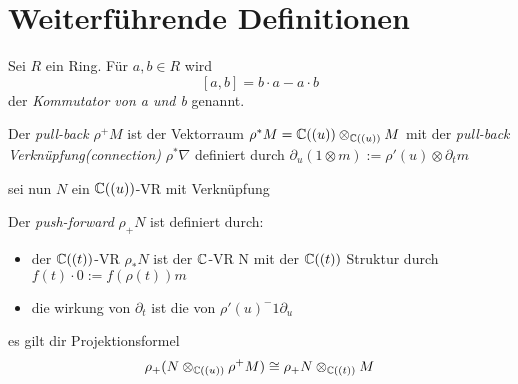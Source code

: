 \section{Weiterführende Definitionen}

\begin{defn}[Kommutator]%
  Sei $R$ ein Ring. Für $a,b\in R$ wird
  \[[a,b]=b\cdot a-a\cdot b\]
  der \emph{Kommutator von a und b} genannt.
\end{defn}

\begin{defn}
  Der \emph{pull-back} $\rho^{+}M$ ist der Vektorraum
  $\rho^{*}M={\mathbb C}((u))\otimes_{{\mathbb C}((u))}M$ mit
  der \emph{pull-back Verknüpfung(connection)} $\rho^*\nabla$ definiert durch
  $\partial_u(1\otimes m):=\rho'(u)\otimes\partial_tm$
\end{defn}

sei nun $N$ ein ${\mathbb C}((u))$-VR mit Verknüpfung
\begin{defn}
  Der \emph{push-forward} $\rho_+N$ ist definiert durch:
  \begin{itemize}
    \item der ${\mathbb C}((t))$-VR $\rho_*N$ ist der ${\mathbb C}$-VR N mit der ${\mathbb C}((t))$
      Struktur durch $f(t)\cdot 0:=f(\rho(t))m$
    \item die wirkung von $\partial_t$ ist die von $\rho'(u)^-1\partial_u$
  \end{itemize}
\end{defn}
\begin{thm} \label{thm:Projektionsformel}
  es gilt dir Projektionsformel
  \begin{equation} \label{eq:Projektionsformel}
    \rho_+(N\otimes_{{\mathbb C}((u))}\rho^+M)\cong\rho_+N\otimes_{{\mathbb C}((t))}M
  \end{equation}
\end{thm}

\begin{comment}
  TEST für ref\\
  \ref{thm:Projektionsformel}\\
  TEST für eqref\\
  \eqref{eq:Projektionsformel}\\
\end{comment}

